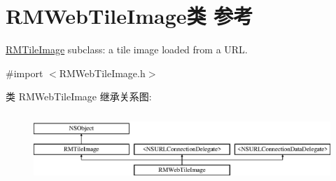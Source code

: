 \hypertarget{interface_r_m_web_tile_image}{\section{R\-M\-Web\-Tile\-Image类 参考}
\label{interface_r_m_web_tile_image}
}


\hyperlink{interface_r_m_tile_image}{R\-M\-Tile\-Image} subclass\-: a tile image loaded from a U\-R\-L.  




{\ttfamily \#import $<$R\-M\-Web\-Tile\-Image.\-h$>$}

类 R\-M\-Web\-Tile\-Image 继承关系图\-:\begin{figure}[H]
\begin{center}
\leavevmode
\includegraphics[height=2.616822cm]{interface_r_m_web_tile_image}
\end{center}
\end{figure}
